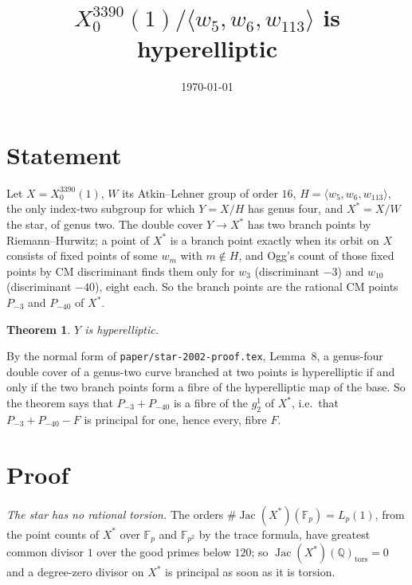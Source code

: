 \documentclass[11pt,reqno]{amsart}
\theoremstyle{plain}
\newtheorem{theorem}{Theorem}[section]
\theoremstyle{definition}
\DeclareMathOperator{\Jac}{Jac}
\newcommand{\Q}{\mathbb{Q}}
\newcommand{\F}{\mathbb{F}}
\begin{document}
\title{$X_0^{3390}(1)/\langle w_5,w_6,w_{113}\rangle$ is hyperelliptic}
\author{}
\date{\today}
\maketitle

\section{Statement}

Let $X=X_0^{3390}(1)$, $W$ its Atkin--Lehner group of order $16$, $H=\langle w_5,w_6,w_{113}\rangle$, the only
index-two subgroup for which $Y=X/H$ has genus four, and $X^*=X/W$ the star, of genus two. The double cover
$Y\to X^*$ has two branch points by Riemann--Hurwitz; a point of $X^*$ is a branch point exactly when its orbit
on $X$ consists of fixed points of some $w_m$ with $m\notin H$, and Ogg's count of those fixed points by CM
discriminant finds them only for $w_3$ (discriminant $-3$) and $w_{10}$ (discriminant $-40$), eight each. So the
branch points are the rational CM points $P_{-3}$ and $P_{-40}$ of $X^*$.

\begin{theorem}\label{thm:main}
$Y$ is hyperelliptic.
\end{theorem}

By the normal form of \texttt{paper/star-2002-proof.tex}, Lemma~8, a genus-four double cover of a genus-two curve
branched at two points is hyperelliptic if and only if the two branch points form a fibre of the hyperelliptic map
of the base. So the theorem says that $P_{-3}+P_{-40}$ is a fibre of the $g^1_2$ of $X^*$, i.e.\ that
$P_{-3}+P_{-40}-F$ is principal for one, hence every, fibre $F$.

\section{Proof}

\emph{The star has no rational torsion.} The orders $\#\Jac(X^*)(\F_p)=L_p(1)$, from the point counts of $X^*$
over $\F_p$ and $\F_{p^2}$ by the trace formula, have greatest common divisor $1$ over the good primes below
$120$; so $\Jac(X^*)(\Q)_{\mathrm{tors}}=0$ and a degree-zero divisor on $X^*$ is principal as soon as it is
torsion.
\end{document}
